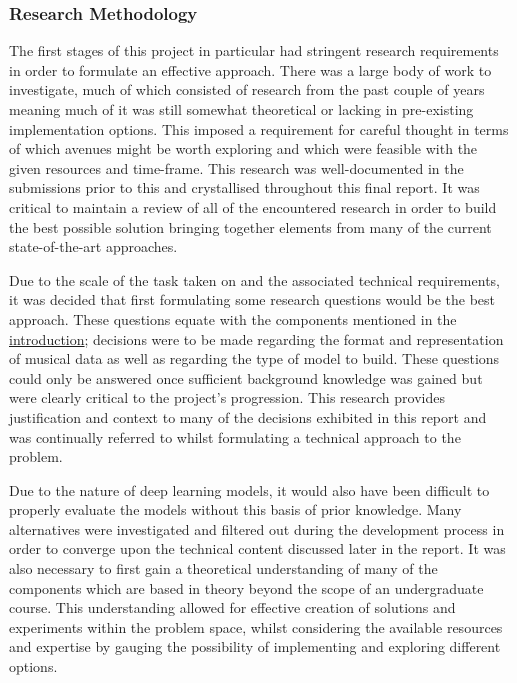 \documentclass[12pt,]{article}
\begin{document}
\hypertarget{research-methodology}{%
\subsubsection{Research Methodology}\label{research-methodology}}

The first stages of this project in particular had stringent research
requirements in order to formulate an effective approach. There was a
large body of work to investigate, much of which consisted of research
from the past couple of years meaning much of it was still somewhat
theoretical or lacking in pre-existing implementation options. This
imposed a requirement for careful thought in terms of which avenues
might be worth exploring and which were feasible with the given
resources and time-frame. This research was well-documented in the
submissions prior to this and crystallised throughout this final report.
It was critical to maintain a review of all of the encountered research
in order to build the best possible solution bringing together elements
from many of the current state-of-the-art approaches.

Due to the scale of the task taken on and the associated technical
requirements, it was decided that first formulating some research
questions would be the best approach. These questions equate with the
components mentioned in the
\protect\hyperlink{introduction}{introduction}; decisions were to be
made regarding the format and representation of musical data as well as
regarding the type of model to build. These questions could only be
answered once sufficient background knowledge was gained but were
clearly critical to the project's progression. This research provides
justification and context to many of the decisions exhibited in this
report and was continually referred to whilst formulating a technical
approach to the problem.

Due to the nature of deep learning models, it would also have been
difficult to properly evaluate the models without this basis of prior
knowledge. Many alternatives were investigated and filtered out during
the development process in order to converge upon the technical content
discussed later in the report. It was also necessary to first gain a
theoretical understanding of many of the components which are based in
theory beyond the scope of an undergraduate course. This understanding
allowed for effective creation of solutions and experiments within the
problem space, whilst considering the available resources and expertise
by gauging the possibility of implementing and exploring different
options.
\end{document}
